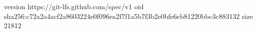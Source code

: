 version https://git-lfs.github.com/spec/v1
oid sha256:c72a2a4acf2a8603224e0f096ea2f7f1a5b7f3b2e0bfe6eb81220bbc3c883132
size 21812
